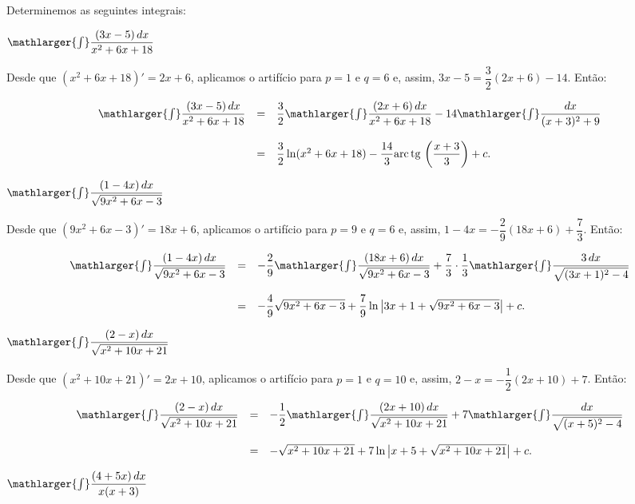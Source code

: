 \cleardoublepage\documentclass[../main.tex]{subfiles}
\begin{document}
\begin{ex}
Determinemos as seguintes integrais:
\begin{compactenum}[a)]
\item \(\mathlarger{\int}\dfrac{(3x-5)\,dx}{x^2+6x+18}\)\\

\begin{solution}
Desde que \((x^2+6x+18)'=2x+ 6\), aplicamos o artifício para \(p=1\) e \(q=6\) e, assim, \(3x-5 =\dfrac{3}{2}(2x+6)-14\). Então:

\[ \begin{array}{rcl} \mathlarger{\int}\dfrac{(3x-5)\,dx}{x^2+6x+18}&=&\dfrac{3}{2}\mathlarger{\int}\dfrac{(2x+6)\,dx}{x^2+6x+18}- 14 \mathlarger{\int}\dfrac{dx}{(x+3)^2+9}\\ \\ & =& \dfrac{3}{2} \ln(x^2+6x+18) -\dfrac{14}{3} {\rm arc\,tg\,} \left(\dfrac{x+3}{3} \right)+c. \end{array} \]
\end{solution}
\item \(\mathlarger{\int}\dfrac{(1-4x)\,dx}{\sqrt{9x^2+6x-3}}\)\\

\begin{solution}
Desde que \((9x^2+6x-3)'=18x+ 6\), aplicamos o artifício para \(p=9\) e \(q=6\) e, assim, \(1-4x = -\dfrac{2}{9}(18x+6)+\dfrac{7}{3}\). Então:

\[ \begin{array}{rcl} \mathlarger{\int}\dfrac{(1-4x)\,dx}{\sqrt{9x^2+6x-3}} &=&-\dfrac{2}{9} \mathlarger{\int}\dfrac{(18x+6)\,dx}{\sqrt{9x^2+6x-3}} + \dfrac{7}{3}\cdot \dfrac{1}{3}\mathlarger{\int}\dfrac{3\,dx}{\sqrt{(3x+1)^2-4}}\\ \\ &=& -\dfrac{4}{9}\sqrt{9x^2+6x-3}+ \dfrac{7}{9} \ln \left| 3x+1+ \sqrt{9x^2+6x-3} \right|+c. \end{array} \]
\end{solution}
\item \(\mathlarger{\int}\dfrac{(2-x)\,dx}{\sqrt{x^2+10x+21}}\)\\

\begin{solution}
Desde que \((x^2+10x+21)'=2x+ 10\), aplicamos o artifício para \(p=1\) e \(q=10\) e, assim, \(2-x = -\dfrac{1}{2}(2x+10)+7\). Então:

\[ \begin{array}{rcl} \mathlarger{\int}\dfrac{(2-x)\,dx}{\sqrt{x^2+10x+21}} &=&-\dfrac{1}{2}\mathlarger{\int}\dfrac{(2x+10)\,dx}{\sqrt{x^2+10x+21}} + 7\mathlarger{\int}\dfrac{dx}{\sqrt{(x+5)^2-4}}\\ \\ &=& - \sqrt{x^2+10x+21}+ 7 \ln \left| x+5 + \sqrt{x^2+10x+21} \right|+c. \end{array} \]
\end{solution}
\item \(\mathlarger{\int}\dfrac{(4+5x)\,dx}{x(x+3)}\)\\


\end{compactenum}
\end{ex}
\end{document}
